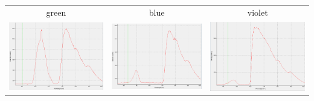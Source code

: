 \documentclass[12pt,a4paper]{article}
\begin{document}
\begin{tabular}{c c c}
green & blue & violet\\
\includegraphics[scale=.23]{green} & \includegraphics[scale=.23]{blue} & \includegraphics[scale=.23]{violet}\\
\end{tabular}
\end{document}
